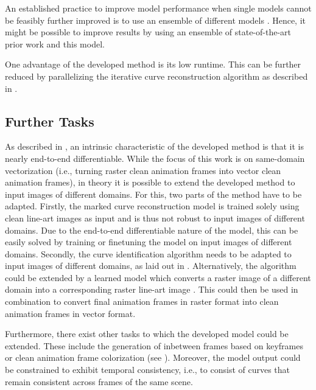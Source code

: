 An established practice to improve model performance when single models cannot be feasibly further improved is to use an ensemble of different models \citep{Schapire1990,598994}. Hence, it might be possible to improve results by using an ensemble of state-of-the-art prior work and this model.

One advantage of the developed method is its low runtime. This can be further reduced by parallelizing the iterative curve reconstruction algorithm as described in .

\subsection{Further Tasks}
\label{subsec:future.tasks}

As described in , an intrinsic characteristic of the developed method is that it is nearly end-to-end differentiable. While the focus of this work is on same-domain vectorization (i.e., turning raster clean animation frames into vector clean animation frames), in theory it is possible to extend the developed method to input images of different domains. For this, two parts of the method have to be adapted. Firstly, the marked curve reconstruction model is trained solely using clean line-art images as input and is thus not robust to input images of different domains. Due to the end-to-end differentiable nature of the model, this can be easily solved by training or finetuning the model on input images of different domains. Secondly, the curve identification algorithm needs to be adapted to input images of different domains, as laid out in . Alternatively, the algorithm could be extended by a learned model which converts a raster image of a different domain into a corresponding raster line-art image \citep{Kugler-2021}. This could then be used in combination to convert final animation frames in raster format into clean animation frames in vector format.

Furthermore, there exist other tasks to which the developed model could be extended. These include the generation of inbetween frames based on keyframes or clean animation frame colorization (see ). Moreover, the model output could be constrained to exhibit temporal consistency, i.e., to consist of curves that remain consistent across frames of the same scene.